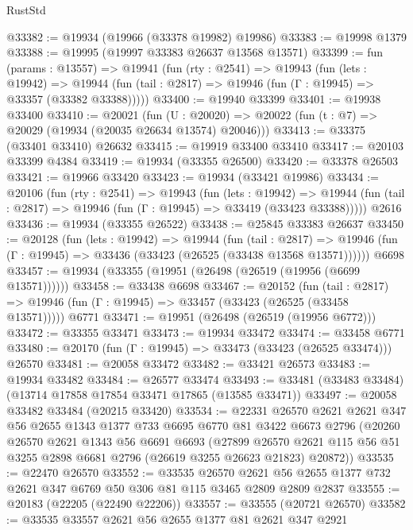 \begin{lexlean}{RustStd}
\begin{coremodule}
@33382 := @19934 (@19966 (@33378 @19982) @19986)
@33383 := @19998 @1379
@33388 := @19995 (@19997 @33383 @26637 @13568 @13571)
@33399 := fun (params : @13557) =>
  @19941
    (fun (rty : @2541) =>
    @19943
      (fun (lets : @19942) =>
      @19944 (fun (tail : @2817) => @19946 (fun (Γ : @19945) => @33357 (@33382 @33388)))))
@33400 := @19940 @33399
@33401 := @19938 @33400
@33410 := @20021
    (fun (U : @20020) => @20022 (fun (t : @7) => @20029 (@19934 (@20035 @26634 @13574) @20046)))
@33413 := @33375 (@33401 @33410) @26632
@33415 := @19919 @33400 @33410
@33417 := @20103 @33399 @4384
@33419 := @19934 (@33355 @26500)
@33420 := @33378 @26503
@33421 := @19966 @33420
@33423 := @19934 (@33421 @19986)
@33434 := @20106
    (fun (rty : @2541) =>
    @19943
      (fun (lets : @19942) =>
      @19944 (fun (tail : @2817) => @19946 (fun (Γ : @19945) => @33419 (@33423 @33388)))))
    @2616
@33436 := @19934 (@33355 @26522)
@33438 := @25845 @33383 @26637
@33450 := @20128
    (fun (lets : @19942) =>
    @19944
      (fun (tail : @2817) =>
      @19946 (fun (Γ : @19945) => @33436 (@33423 (@26525 (@33438 @13568 @13571))))))
    @6698
@33457 := @19934 (@33355 (@19951 (@26498 (@26519 (@19956 (@6699 @13571))))))
@33458 := @33438 @6698
@33467 := @20152
    (fun (tail : @2817) => @19946 (fun (Γ : @19945) => @33457 (@33423 (@26525 (@33458 @13571)))))
    @6771
@33471 := @19951 (@26498 (@26519 (@19956 @6772)))
@33472 := @33355 @33471
@33473 := @19934 @33472
@33474 := @33458 @6771
@33480 := @20170 (fun (Γ : @19945) => @33473 (@33423 (@26525 @33474))) @26570
@33481 := @20058 @33472
@33482 := @33421 @26573
@33483 := @19934 @33482
@33484 := @26577 @33474
@33493 := @33481 (@33483 @33484) (@13714 @17858 @17854 @33471 @17865 (@13585 @33471))
@33497 := @20058 @33482 @33484 (@20215 @33420)
@33534 := @22331
    @26570
    @2621
    @2621
    @347
    @56
    @2655
    @1343
    @1377
    @733
    @6695
    @6770
    @81
    @3422
    @6673
    @2796
    (@20260
      @26570
      @2621
      @1343
      @56
      @6691
      @6693
      (@27899
        @26570
        @2621
        @115
        @56
        @51
        @3255
        @2898
        @6681
        @2796
        (@26619 @3255 @26623 @21823)
        @20872))
@33535 := @22470 @26570
@33552 := @33535
    @26570
    @2621
    @56
    @2655
    @1377
    @732
    @2621
    @347
    @6769
    @50
    @306
    @81
    @115
    @3465
    @2809
    @2809
    @2837
@33555 := @20183 (@22205 (@22490 @22206))
@33557 := @33555 (@20721 @26570)
@33582 := @33535
    @33557
    @2621
    @56
    @2655
    @1377
    @81
    @2621
    @347
    @2921

\end{coremodule}
\end{lexlean}
